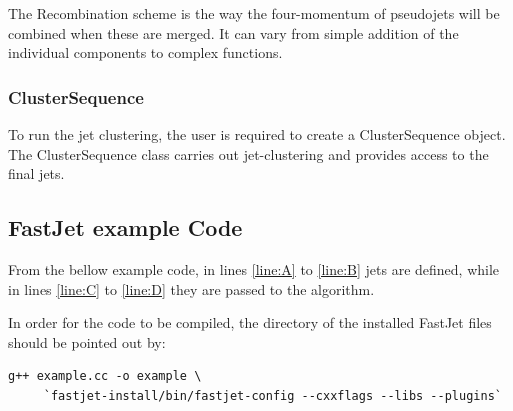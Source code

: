 The Recombination scheme is the way the four-momentum of pseudojets will be combined when these are merged. It can vary from simple addition of the individual components to complex functions.


\subsubsection{ClusterSequence}
To run the jet clustering, the user is required to create a ClusterSequence object. The ClusterSequence class carries out jet-clustering and provides access to the final jets.

\subsection{FastJet example Code}\label{ch:fjexample}
From the bellow example code, in lines \ref{line:A} to \ref{line:B} jets are defined, while in lines \ref{line:C} to \ref{line:D} they are passed to the algorithm.




In order for the code to be compiled, the directory of the installed FastJet files should be pointed out by:

\begin{lstlisting}
g++ example.cc -o example \
     `fastjet-install/bin/fastjet-config --cxxflags --libs --plugins`
\end{lstlisting}